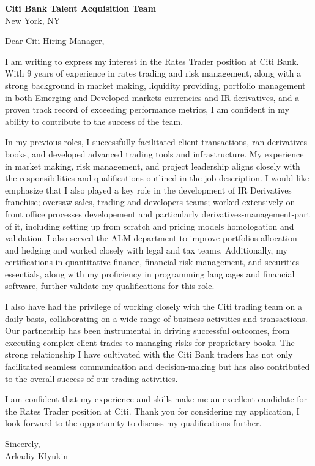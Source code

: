\documentclass{letter}
\begin{document}
\begin{letter}{\textbf{Citi Bank Talent Acquisition Team} \\
                New York, NY}


\opening{Dear Citi Hiring Manager,}

I am writing to express my interest in the Rates Trader position at Citi Bank. With 9 years of experience in rates trading and risk management, along with a strong background in market making, liquidity providing, portfolio management in both Emerging and Developed markets currencies and IR derivatives, and a proven track record of exceeding performance metrics, I am confident in my ability to contribute to the success of the team.

In my previous roles, I successfully facilitated client transactions, ran derivatives books, and developed advanced trading tools and infrastructure. My experience in market making, risk management, and project leadership aligns closely with the responsibilities and qualifications outlined in the job description. I would like emphasize that I also played a key role in the development of IR Derivatives franchise; oversaw sales, trading and developers teams; worked extensively on front office processes developement and particularly derivatives-management-part of it, including setting up from scratch and pricing models homologation and validation. I also served the ALM department to improve portfolios allocation and hedging and worked closely with legal and tax teams. Additionally, my certifications in quantitative finance, financial risk management, and securities essentials, along with my proficiency in programming languages and financial software, further validate my qualifications for this role.

I also have had the privilege of working closely with the Citi trading team on a daily basis, collaborating on a wide range of business activities and transactions. Our partnership has been instrumental in driving successful outcomes, from executing complex client trades to managing risks for proprietary books. The strong relationship I have cultivated with the Citi Bank traders has not only facilitated seamless communication and decision-making but has also contributed to the overall success of our trading activities.

I am confident that my experience and skills make me an excellent candidate for the Rates Trader position at Citi. Thank you for considering my application, I look forward to the opportunity to discuss my qualifications further.

Sincerely,\\
Arkadiy Klyukin
\end{letter}
\end{document}
